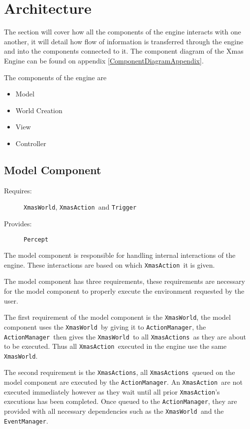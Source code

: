 
\section{Architecture}

The section will cover how all the components of the engine interacts
with one another, it will detail how flow of information is transferred
through the engine and into the components connected to it. The component
diagram of the Xmas Engine can be found on appendix \ref{ComponentDiagramAppendix}.

The components of the engine are
\begin{itemize}
\item Model
\item World Creation
\item View
\item Controller
\end{itemize}

\subsection{Model Component}
\begin{description}
\item [{Requires:}] \texttt{XmasWorld}, \texttt{XmasAction }and \texttt{Trigger }
\item [{Provides:}] \texttt{Percept}
\end{description}
The model component is responsible for handling internal interactions
of the engine. These interactions are based on which \texttt{XmasAction
}it is given. 

The model component has three requirements, these requirements are
necessary for the model component to properly execute the environment
requested by the user.

The first requirement of the model component is the \texttt{XmasWorld},
the model component uses the \texttt{XmasWorld }by giving it to \texttt{ActionManager},
the \texttt{ActionManager }then gives the \texttt{XmasWorld }to all
\texttt{XmasActions }as they are about to be executed. Thus all \texttt{XmasAction
}executed in the engine use the same \texttt{XmasWorld}.

The second requirement is the \texttt{XmasActions}, all \texttt{XmasActions
}queued on the model component are executed by the \texttt{ActionManager}.
An \texttt{XmasAction }are not executed immediately however as they
wait until all prior \texttt{XmasAction}\textquoteright{}s executions
has been completed. Once queued to the \texttt{ActionManager}, they
are provided with all necessary dependencies such as the \texttt{XmasWorld
}and the \texttt{EventManager}.

